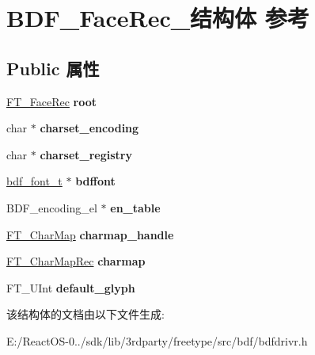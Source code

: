 \hypertarget{struct_b_d_f___face_rec__}{}\section{B\+D\+F\+\_\+\+Face\+Rec\+\_\+结构体 参考}
\label{struct_b_d_f___face_rec__}
\subsection*{Public 属性}
\begin{DoxyCompactItemize}
\item 
\mbox{\label{struct_b_d_f___face_rec___a7ab943d1e90a080fabe35fc666a32571}} 
\hyperlink{struct_f_t___face_rec__}{F\+T\+\_\+\+Face\+Rec} {\bfseries root}
\item 
\mbox{\label{struct_b_d_f___face_rec___ae1a370fa10fa83a32e4bc2f34786fed9}} 
char $\ast$ {\bfseries charset\+\_\+encoding}
\item 
\mbox{\label{struct_b_d_f___face_rec___a45cf42c416ab6a8fa58dba439102714b}} 
char $\ast$ {\bfseries charset\+\_\+registry}
\item 
\mbox{\label{struct_b_d_f___face_rec___a7ac32b1e473f46059d30bc47df096f4a}} 
\hyperlink{structbdf__font__t__}{bdf\+\_\+font\+\_\+t} $\ast$ {\bfseries bdffont}
\item 
\mbox{\label{struct_b_d_f___face_rec___a8a0de8b7cdd5690da76636d45835b7fd}} 
B\+D\+F\+\_\+encoding\+\_\+el $\ast$ {\bfseries en\+\_\+table}
\item 
\mbox{\label{struct_b_d_f___face_rec___a495286de738de7d0cc5b9d32a604ea9b}} 
\hyperlink{struct_f_t___char_map_rec__}{F\+T\+\_\+\+Char\+Map} {\bfseries charmap\+\_\+handle}
\item 
\mbox{\label{struct_b_d_f___face_rec___a39f615a95d80abc0304a3e94eda1923f}} 
\hyperlink{struct_f_t___char_map_rec__}{F\+T\+\_\+\+Char\+Map\+Rec} {\bfseries charmap}
\item 
\mbox{\label{struct_b_d_f___face_rec___aec0dd8d657f8de6e8986a376522d53a1}} 
F\+T\+\_\+\+U\+Int {\bfseries default\+\_\+glyph}
\end{DoxyCompactItemize}


该结构体的文档由以下文件生成\+:\begin{DoxyCompactItemize}
\item 
E\+:/\+React\+O\+S-\/0../sdk/lib/3rdparty/freetype/src/bdf/bdfdrivr.\+h\end{DoxyCompactItemize}
